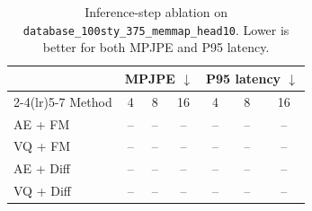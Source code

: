 \begin{table}[t]
\centering
\caption{Inference-step ablation on \texttt{database\_100sty\_375\_memmap\_head10}. Lower is better for both MPJPE and P95 latency.}
\label{tab:steps_ablation}
\setlength{\tabcolsep}{5.5pt}
\renewcommand{\arraystretch}{1.12}
\begin{tabular}{lcccccc}
\toprule
& \multicolumn{3}{c}{MPJPE $\downarrow$} & \multicolumn{3}{c}{P95 latency $\downarrow$} \\
\cmidrule(lr){2-4}\cmidrule(lr){5-7}
Method & 4 & 8 & 16 & 4 & 8 & 16 \\
\midrule
AE + FM & -- & -- & -- & -- & -- & -- \\
VQ + FM & -- & -- & -- & -- & -- & -- \\
AE + Diff & -- & -- & -- & -- & -- & -- \\
VQ + Diff & -- & -- & -- & -- & -- & -- \\
\bottomrule
\end{tabular}
\end{table}
